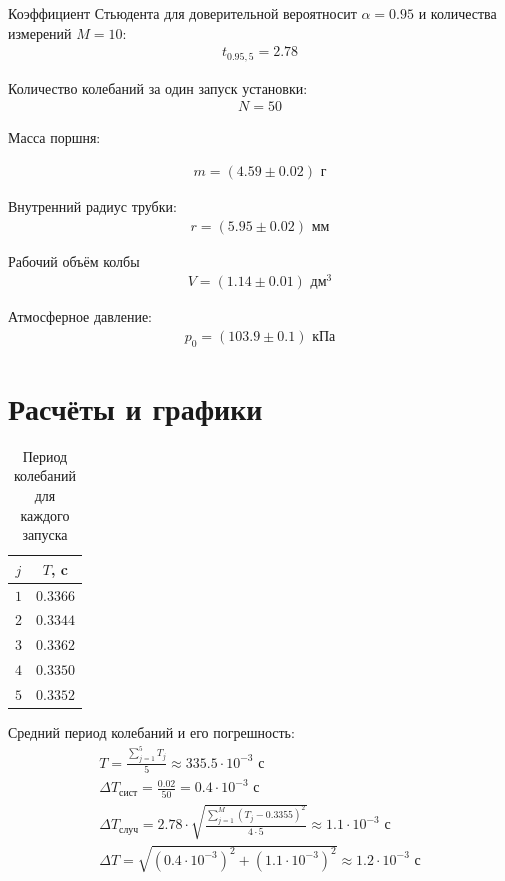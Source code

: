 \documentclass{article}
\begin{document}
Коэффициент Стьюдента для доверительной вероятносит $\alpha = 0.95$ и количества измерений $M = 10$:
\begin{gather*}
    t_{ 0.95, 5} = 2.78
\end{gather*}

Количество колебаний за один запуск установки:
\begin{gather*}
    N = 50
\end{gather*}

Масса поршня:

\begin{gather*}
    m = (4.59\pm0.02)\text{ г}
\end{gather*}

Внутренний радиус трубки:
\begin{gather*}
    r = (5.95\pm0.02) \text{ мм}    
\end{gather*}

Рабочий объём колбы
\begin{gather*}
    V = (1.14\pm0.01) \text{ дм}^3
\end{gather*}

Атмосферное давление:
\begin{gather*}
    p_0 = (103.9\pm0.1) \text{ кПа}
\end{gather*}

\section{Расчёты и графики}
\begin{table}[H]
   \centering
   \caption{Период колебаний для каждого запуска}
   \begin{tabular}{|c|c|} \hline
        $j$ & $T$, c \\ \hline
        $1$ & $0.3366$ \\ \hline
        $2$ & $0.3344$ \\ \hline
        $3$ & $0.3362$ \\ \hline
        $4$ & $0.3350$ \\ \hline
        $5$ & $0.3352$ \\ \hline
\end{tabular}
\end{table}

Средний период колебаний и его погрешность:
\begin{gather*}
        T = \frac{ \sum\limits_{ j=1}^{ 5}T_j}{ 5} \approx  335.5\cdot10^{-3}\text{ с}\\
    \Delta T_{ \text{сист}} = \frac{ 0.02}{ 50} = 0.4\cdot10^{-3}\text{ с}\\
    \Delta T_{ \text{случ}} = 2.78\cdot\sqrt{\frac{ \sum\limits_{ j=1}^{M }(T_j - 0.3355)^2}{ 4\cdot5} }\approx1.1\cdot10^{-3}\text{ с}\\
    \Delta T = \sqrt{(0.4\cdot10^{-3})^2 + (1.1\cdot10^{-3})^2}\approx1.2\cdot10^{-3}\text{ с}
\end{gather*}
\end{document}
